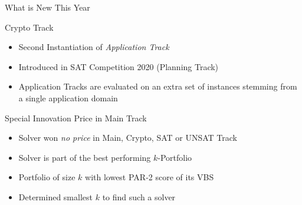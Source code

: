 \documentclass[trans]{beamer}
\begin{document}
\begin{frame}{What is New This Year}

\begin{block}{Crypto Track}
  \begin{itemize}
  \item Second Instantiation of \emph{Application Track}
  \item Introduced in SAT Competition 2020 (Planning Track)
  \item Application Tracks are evaluated on an extra set of instances stemming from a single application domain
  \end{itemize}
\end{block}

\begin{block}{Special Innovation Price in Main Track}
  \begin{itemize}
  \item Solver won \emph{no price} in Main, Crypto, SAT or UNSAT Track 
  \item Solver is part of the best performing $k$-Portfolio
  \item Portfolio of size $k$ with lowest PAR-2 score of its VBS
  \item Determined smallest $k$ to find such a solver
  \end{itemize}
\end{block}

\end{frame}
\end{document}
